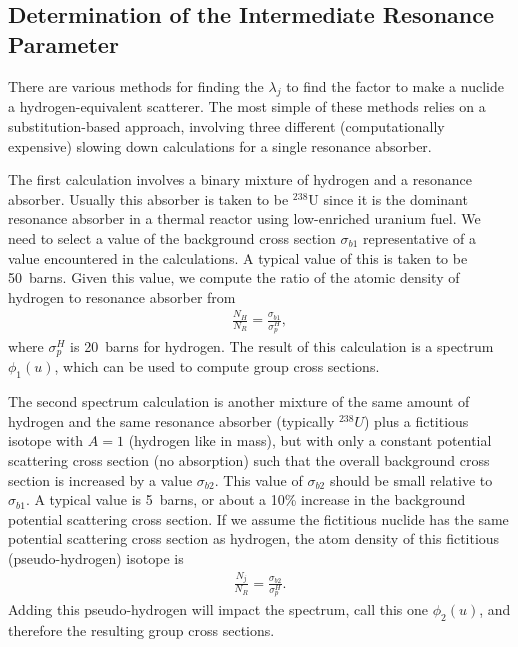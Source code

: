 \subsection{Determination of the Intermediate Resonance Parameter}

There are various methods for finding the $\lambda_j$ to find the factor to make a nuclide a hydrogen-equivalent scatterer. The most simple of these methods relies on a substitution-based approach, involving three different (computationally expensive) slowing down calculations for a single resonance absorber.

The first calculation involves a binary mixture of hydrogen and a resonance absorber. Usually this absorber is taken to be $^{238}$U since it is the dominant resonance absorber in a thermal reactor using low-enriched uranium fuel. We need to select a value of the background cross section $\sigma_{b1}$ representative of a value encountered in the calculations. A typical value of this is taken to be 50~barns. Given this value, we compute the ratio of the atomic density of hydrogen to resonance absorber from
\begin{align}
  \frac{N_H}{N_R} = \frac{ \sigma_{b1} }{ \sigma_p^H },
\end{align}
where $\sigma_p^H$ is 20~barns for hydrogen. The result of this calculation is a spectrum $\phi_1(u)$, which can be used to compute group cross sections.

The second spectrum calculation is another mixture of the same amount of hydrogen and the same resonance absorber (typically $^{238}U$) plus a fictitious isotope with $A = 1$ (hydrogen like in mass), but with only a constant potential scattering cross section (no absorption) such that the overall background cross section is increased by a value $\sigma_{b2}$. This value of $\sigma_{b2}$ should be small relative to $\sigma_{b1}$. A typical value is 5~barns, or about a 10\% increase in the background potential scattering cross section. If we assume the fictitious nuclide has the same potential scattering cross section as hydrogen, the atom density of this fictitious (pseudo-hydrogen) isotope is
\begin{align}
  \frac{N_j}{N_R} = \frac{ \sigma_{b2} }{ \sigma_p^H } .
\end{align}
Adding this pseudo-hydrogen will impact the spectrum, call this one $\phi_2(u)$, and therefore the resulting group cross sections.

